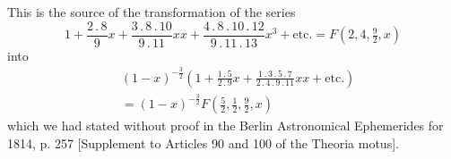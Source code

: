 This is the source of the transformation of the series
\[
1+\frac{2\,.\,8}{9}x+\frac{3\,.\,8\,.\,10}{9\,.\,11}xx+\frac{4\,.\,8\,.\,10\,.\,12}{9\,.\,11\,.\,13}x^3+\text{etc.}=F(2,4,\tfrac{9}{2},x)
\]
into
\[
\begin{aligned}&(1-x)^{-\frac{3}{2}}\left(1+\frac{1\,.\,5}{2\,.\,9}x+\frac{1\,.\,3\,.\,5\,.\,7}{2\,.\,4\,.\,9\,.\,11}xx+\text{etc.}\right)\\&=(1-x)^{-\frac{3}{2}}F(\tfrac{5}{2},\tfrac{1}{2},\tfrac{9}{2},x)\end{aligned}
\]
which we had stated without proof in the Berlin Astronomical Ephemerides for 1814, p. 257 [Supplement to Articles 90 and 100 of the Theoria motus].

